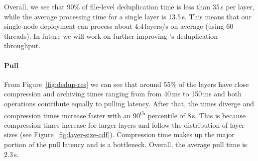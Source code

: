 %
Overall, we see that 90\% of file-level deduplication time is less than 35\,s
per layer, while the average processing time for a single layer is 13.5\,s.
%
This means that our single-node deployment can process about 4.4\,layers/s on average
(using 60 threads).
%
In future we will work on further improving \sysname's deduplication throughput.
%
%

\paragraph{Pull} 

From Figure~\ref{fig:dedup-res}
we can see that around 55\% of the layers have close compression and archiving
times ranging from from 40\,ms to 150\,ms and both operations contribute equally
to pulling latency.
%
%
%
After that, the times diverge and compression times increase faster with an
90\textsuperscript{th} percentile of 8\,s.
%
This is because compression times increase for larger layers and follow the distribution
of layer sizes (see Figure~\ref{fig:layer-size-cdf}).
%
%
Compression time makes up the major portion of the pull latency and is a
bottleneck.
%
Overall, the average pull time is 2.3\,s.

%
